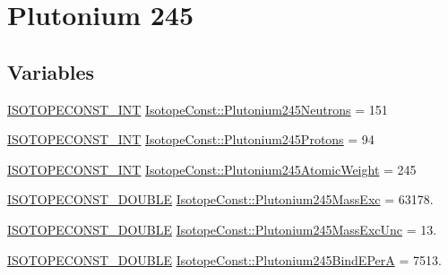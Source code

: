 \hypertarget{group___isotope_const-_plutonium-_pu245}{}\section{Plutonium 245}
\label{group___isotope_const-_plutonium-_pu245}
\subsection*{Variables}
\begin{DoxyCompactItemize}
\item 
\mbox{\hyperlink{group___isotope_const-_macros_ga5f18360b3e99483a35c32d789e62621c}{I\+S\+O\+T\+O\+P\+E\+C\+O\+N\+S\+T\+\_\+\+I\+NT}} \mbox{\hyperlink{group___isotope_const-_plutonium-_pu245_gafa751be40f2111b52a1713e81c0e15b4}{Isotope\+Const\+::\+Plutonium245\+Neutrons}} = 151
\item 
\mbox{\hyperlink{group___isotope_const-_macros_ga5f18360b3e99483a35c32d789e62621c}{I\+S\+O\+T\+O\+P\+E\+C\+O\+N\+S\+T\+\_\+\+I\+NT}} \mbox{\hyperlink{group___isotope_const-_plutonium-_pu245_gae8846e6f3abb606f59b4e61a83b9c367}{Isotope\+Const\+::\+Plutonium245\+Protons}} = 94
\item 
\mbox{\hyperlink{group___isotope_const-_macros_ga5f18360b3e99483a35c32d789e62621c}{I\+S\+O\+T\+O\+P\+E\+C\+O\+N\+S\+T\+\_\+\+I\+NT}} \mbox{\hyperlink{group___isotope_const-_plutonium-_pu245_ga2ea7ce2f4d7ccd89e51861e09ff95be2}{Isotope\+Const\+::\+Plutonium245\+Atomic\+Weight}} = 245
\item 
\mbox{\hyperlink{group___isotope_const-_macros_ga8f45a7272ce02c0b4c65c44636ed719a}{I\+S\+O\+T\+O\+P\+E\+C\+O\+N\+S\+T\+\_\+\+D\+O\+U\+B\+LE}} \mbox{\hyperlink{group___isotope_const-_plutonium-_pu245_ga1d7a2fb0a2ec7a9a26b8f76201cc2ba7}{Isotope\+Const\+::\+Plutonium245\+Mass\+Exc}} = 63178.
\item 
\mbox{\hyperlink{group___isotope_const-_macros_ga8f45a7272ce02c0b4c65c44636ed719a}{I\+S\+O\+T\+O\+P\+E\+C\+O\+N\+S\+T\+\_\+\+D\+O\+U\+B\+LE}} \mbox{\hyperlink{group___isotope_const-_plutonium-_pu245_ga7dd3570f7dd5bc5ef62102027167d93c}{Isotope\+Const\+::\+Plutonium245\+Mass\+Exc\+Unc}} = 13.
\item 
\mbox{\hyperlink{group___isotope_const-_macros_ga8f45a7272ce02c0b4c65c44636ed719a}{I\+S\+O\+T\+O\+P\+E\+C\+O\+N\+S\+T\+\_\+\+D\+O\+U\+B\+LE}} \mbox{\hyperlink{group___isotope_const-_plutonium-_pu245_ga6add66a2ce1cb745e4eb9250d84426ef}{Isotope\+Const\+::\+Plutonium245\+Bind\+E\+PerA}} = 7513.
\item 

\end{DoxyCompactItemize}
